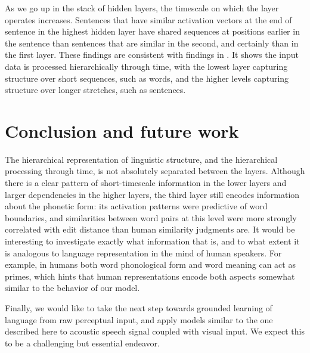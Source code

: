 As we go up in the stack of hidden layers, the timescale on which the layer operates increases. Sentences that have similar activation vectors at the end of sentence in the highest hidden layer have shared sequences at positions earlier in the sentence than sentences that are similar in the second, and certainly than in the first layer. These findings are consistent with findings in . It shows the input data is processed hierarchically through time, with the lowest layer capturing structure over short sequences, such as words, and the higher levels capturing structure over longer stretches, such as sentences. 

\section{Conclusion and future work}
The hierarchical representation of linguistic structure, and the hierarchical processing through time, is not absolutely separated between the layers. Although there is a clear pattern of short-timescale information in the lower layers and larger dependencies in the higher layers, the third layer still encodes information about the phonetic form: its activation patterns were predictive of word boundaries, and similarities between word pairs at this level were more strongly correlated with edit distance than human similarity judgments are. It would be interesting to investigate exactly what information that is, and to what extent it is analogous to language representation in the mind of human speakers. For example, in humans both word phonological form and word meaning can act as primes, which hints that human representations encode both aspects somewhat similar to the behavior of  our model.

Finally, we would like to take the next step towards grounded learning of language from raw perceptual input, and apply models similar to the one described here to acoustic speech signal coupled with visual input. We expect this to be a challenging but essential endeavor.

